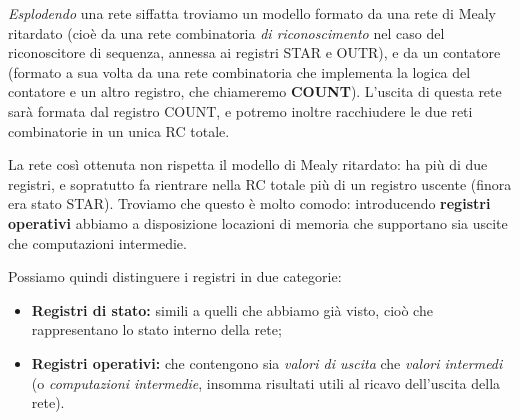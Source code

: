 \documentclass[a4paper,11pt]{article}
\begin{document}
\textit{Esplodendo} una rete siffatta troviamo un modello formato da una rete di Mealy ritardato (cioè da una rete combinatoria \textit{di riconoscimento} nel caso del riconoscitore di sequenza, annessa ai registri STAR e OUTR), e da un contatore (formato a sua volta da una rete combinatoria che implementa la logica del contatore e un altro registro, che chiameremo \textbf{COUNT}).
L'uscita di questa rete sarà formata dal registro COUNT, e potremo inoltre racchiudere le due reti combinatorie in un unica RC totale.

La rete così ottenuta non rispetta il modello di Mealy ritardato: ha più di due registri, e sopratutto fa rientrare nella RC totale più di un registro uscente (finora era stato STAR).
Troviamo che questo è molto comodo: introducendo \textbf{registri operativi} abbiamo a disposizione locazioni di memoria che supportano sia uscite che computazioni intermedie.

Possiamo quindi distinguere i registri in due categorie:
\begin{itemize}
	\item \textbf{Registri di stato:} simili a quelli che abbiamo già visto, cioò che rappresentano lo stato interno della rete;
	\item \textbf{Registri operativi:} che contengono sia \textit{valori di uscita} che \textit{valori intermedi} (o \textit{computazioni intermedie}, insomma risultati utili al ricavo dell'uscita della rete). 
\end{itemize}
\end{document}
